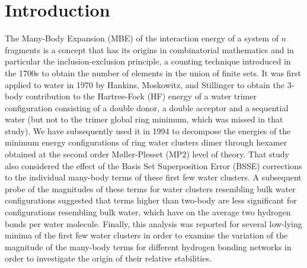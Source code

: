 \documentclass[11pt, proquest]{uwthesis}[2020/02/24]
\begin{document}
\section{Introduction}

\par The Many-Body Expansion (MBE) of the interaction energy of a system of $n$ fragments is a concept that has its origins in combinatorial mathematics and in particular the inclusion-exclusion principle, a counting technique introduced in the 1700s to obtain the number of elements in the union of finite sets.\autocite{roberts_applied_2009} It was first applied to water in 1970 by Hankins, Moskowitz, and Stillinger\autocite{hankins_water_1970} to obtain the 3-body contribution to the Hartree-Fock (HF) energy of a water trimer configuration consisting of a double donor, a double acceptor and a sequential water (but not to the trimer global ring minimum, which was missed in that study). We have subsequently used it in 1994 to decompose the energies of the minimum energy configurations of ring water clusters dimer through hexamer obtained at the second order Møller-Plesset (MP2) level of theory.\autocite{xantheas_ab_1994} That study also considered the effect of the Basis Set Superposition Error (BSSE) corrections\autocite{boys_calculation_1970, xantheas_importance_1996} to the individual many-body terms of these first few water clusters. A subsequent probe of the magnitudes of these terms for water clusters resembling bulk water configurations suggested that terms higher than two-body are less significant for configurations resembling bulk water, which have on the average two hydrogen bonds per water molecule.\autocite{xantheas_significance_1996} Finally, this analysis was reported for several low-lying minima of the first few water clusters in order to examine the variation of the magnitude of the many-body terms for different hydrogen bonding networks in order to investigate the origin of their relative stabilities.\autocite{xantheas_cooperativity_2000}
\end{document}
